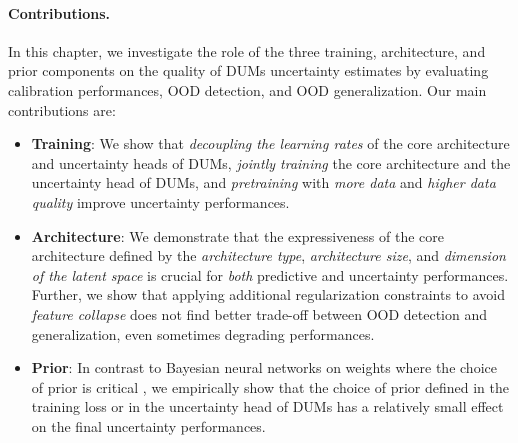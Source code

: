 \paragraph{Contributions.} In this chapter, we investigate the role of the three training, architecture, and prior components on the quality of DUMs uncertainty estimates by evaluating calibration performances, OOD detection, and OOD generalization. Our main contributions are:
\vspace{-2mm}
\begin{itemize}
    \item \textbf{Training}: We show that \emph{decoupling the learning rates} of the core architecture and uncertainty heads of DUMs, \emph{jointly training} the core architecture and the uncertainty head of DUMs, and \emph{pretraining} with \emph{more data} and \emph{higher data quality} improve uncertainty performances. 
    \item \textbf{Architecture}: We demonstrate that the expressiveness of the core architecture defined by the \emph{architecture type}, \emph{architecture size}, and \emph{dimension of the latent space} is crucial for \emph{both} predictive and uncertainty performances. Further, we show that applying additional regularization constraints to avoid \emph{feature collapse} does not find better trade-off between OOD detection and generalization, even sometimes degrading performances.
    \item \textbf{Prior}: In contrast to Bayesian neural networks on weights where the choice of prior is critical \citep{bayesposterior2020wenzel, fortuin2022prior, noci2021prior_cpe, kapoor2022prior_cpe}, we empirically show that the choice of prior defined in the training loss or in the uncertainty head of DUMs has a relatively small effect on the final uncertainty performances.
\end{itemize}
